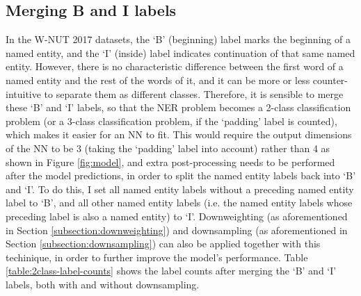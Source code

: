 \documentclass[11pt,a4paper]{article}
\begin{document}
\begin{table}
    \centering
    \caption{Label counts of the downsampled training set.}
    \label{table:2class-label-counts}
\end{table}

\subsection{Merging B and I labels} \label{subsection:2class}

In the W-NUT 2017 datasets, the `B' (beginning) label marks the beginning of a named entity, and the `I' (inside) label indicates continuation of that same named entity. However, there is no characteristic difference between the first word of a named entity and the rest of the words of it, and it can be more or less counter-intuitive to separate them as different classes. Therefore, it is sensible to merge these `B' and `I' labels, so that the NER problem becomes a 2-class classification problem (or a 3-class classification problem, if the `padding' label is counted), which makes it easier for an NN to fit. This would require the output dimensions of the NN to be 3 (taking the `padding' label into account) rather than 4 as shown in Figure \ref{fig:model}, and extra post-processing needs to be performed after the model predictions, in order to split the named entity labels back into `B' and `I'. To do this, I set all named entity labels without a preceding named entity label to `B', and all other named entity labels (i.e. the named entity labels whose preceding label is also a named entity) to `I'. Downweighting (as aforementioned in Section \ref{subsection:downweighting}) and downsampling (as aforementioned in Section \ref{subsection:downsampling}) can also be applied together with this techinique, in order to further improve the model's performance. Table \ref{table:2class-label-counts} shows the label counts after merging the `B' and `I' labels, both with and without downsampling.
\end{document}
